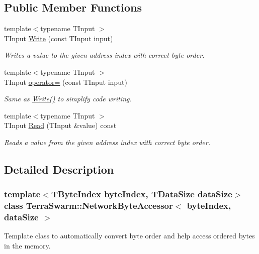 \subsection*{Public Member Functions}
\begin{DoxyCompactItemize}
\item 
{\footnotesize template$<$typename T\-Input $>$ }\\T\-Input \hyperlink{class_terra_swarm_1_1_network_byte_accessor_a7d6e11dd4a5f86e6c036bbcf64bccf25}{Write} (const T\-Input input)
\begin{DoxyCompactList}\small\item\em Writes a value to the given address index with correct byte order. \end{DoxyCompactList}\item 
{\footnotesize template$<$typename T\-Input $>$ }\\T\-Input \hyperlink{class_terra_swarm_1_1_network_byte_accessor_a860d2c70eadf18eccbcf1488f1a0e5d5}{operator=} (const T\-Input input)
\begin{DoxyCompactList}\small\item\em Same as \hyperlink{class_terra_swarm_1_1_network_byte_accessor_a7d6e11dd4a5f86e6c036bbcf64bccf25}{Write()} to simplify code writing. \end{DoxyCompactList}\item 
{\footnotesize template$<$typename T\-Input $>$ }\\T\-Input \hyperlink{class_terra_swarm_1_1_network_byte_accessor_a30b72470a765a59f572cc72db86db29a}{Read} (T\-Input \&value) const 
\begin{DoxyCompactList}\small\item\em Reads a value from the given address index with correct byte order. \end{DoxyCompactList}\end{DoxyCompactItemize}


\subsection{Detailed Description}
\subsubsection*{template$<$T\-Byte\-Index byte\-Index, T\-Data\-Size data\-Size$>$class Terra\-Swarm\-::\-Network\-Byte\-Accessor$<$ byte\-Index, data\-Size $>$}

Template class to automatically convert byte order and help access ordered bytes in the memory. 

